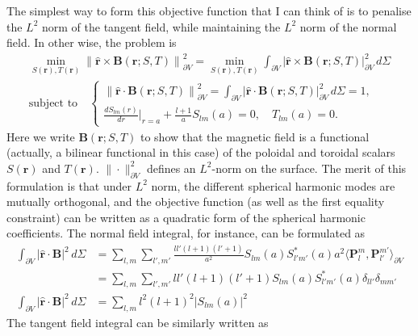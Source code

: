 \documentclass[a4paper, 11pt]{article}
\begin{document}
The simplest way to form this objective function that I can think of is to penalise the $L^2$ norm of the tangent field, while maintaining the $L^2$ norm of the normal field. In other wise, the problem is
\begin{equation}
\begin{gathered}
    \min_{S(\mathbf{r}), T(\mathbf{r})} \left\|\hat{\mathbf{r}} \times \mathbf{B}(\mathbf{r}; S, T)\right\|^2_{\partial V} = \min_{S(\mathbf{r}), T(\mathbf{r})} \int_{\partial V} |\hat{\mathbf{r}} \times \mathbf{B}(\mathbf{r}; S, T)|_{\partial V}^2 \, d\Sigma \\ 
    \text{subject to} \quad \left\{\begin{aligned}
        \left\|\hat{\mathbf{r}}\cdot \mathbf{B}(\mathbf{r};S,T)\right\|^2_{\partial V} = \int_{\partial V} |\hat{\mathbf{r}} \cdot \mathbf{B}(\mathbf{r}; S, T)|_{\partial V}^2 \, d\Sigma = 1, \\ 
        \frac{dS_{lm}(r)}{dr} \bigg|_{r=a} + \frac{l+1}{a} S_{lm}(a) = 0,\quad T_{lm}(a) = 0.
    \end{aligned}\right.
\end{gathered}
\end{equation}
Here we write $\mathbf{B}(\mathbf{r}; S, T)$ to show that the magnetic field is a functional (actually, a bilinear functional in this case) of the poloidal and toroidal scalars $S(\mathbf{r})$ and $T(\mathbf{r})$. $\|\cdot \|^2_{\partial V}$ defines an $L^2$-norm on the surface.
The merit of this formulation is that under $L^2$ norm, the different spherical harmonic modes are mutually orthogonal, and the objective function (as well as the first equality constraint) can be written as a quadratic form of the spherical harmonic coefficients.
The normal field integral, for instance, can be formulated as
\[\begin{aligned}
    \int_{\partial V} |\hat{\mathbf{r}}\cdot \mathbf{B}|^2 \, d\Sigma &= \sum_{l,m} \sum_{l',m'} \frac{ll'(l+1)(l'+1)}{a^2} S_{lm}(a) S_{l'm'}^*(a) a^2 \langle\mathbf{P}_l^m, \mathbf{P}_{l'}^{m'} \rangle_{\partial V} \\ 
    &= \sum_{l,m} \sum_{l',m'} ll'(l+1)(l'+1) S_{lm}(a) S_{l'm'}^*(a) \delta_{ll'} \delta_{mm'} \\ 
    \int_{\partial V} |\hat{\mathbf{r}}\cdot \mathbf{B}|^2 \, d\Sigma &= \sum_{l,m} l^2(l+1)^2 |S_{lm}(a)|^2
\end{aligned}\]
The tangent field integral can be similarly written as
\end{document}
